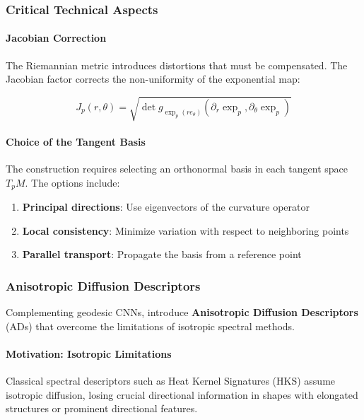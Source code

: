\subsubsection{Critical Technical Aspects}

\paragraph{Jacobian Correction}

The Riemannian metric introduces distortions that must be compensated. The Jacobian factor corrects the non-uniformity of the exponential map:

\begin{equation}
J_p(r, \theta) = \sqrt{\det g_{\exp_p(r e_\theta)}(\partial_r \exp_p, \partial_\theta \exp_p)}
\end{equation}

\paragraph{Choice of the Tangent Basis}

The construction requires selecting an orthonormal basis in each tangent space $T_p M$. The options include:
\begin{enumerate}
    \item \textbf{Principal directions}: Use eigenvectors of the curvature operator
    \item \textbf{Local consistency}: Minimize variation with respect to neighboring points
    \item \textbf{Parallel transport}: Propagate the basis from a reference point
\end{enumerate}

\subsubsection{Anisotropic Diffusion Descriptors}

Complementing geodesic CNNs, \citet{Boscaini2016AnisotropicDD} introduce \textbf{Anisotropic Diffusion Descriptors} (ADs) that overcome the limitations of isotropic spectral methods.

\paragraph{Motivation: Isotropic Limitations}

Classical spectral descriptors such as Heat Kernel Signatures (HKS) assume isotropic diffusion, losing crucial directional information in shapes with elongated structures or prominent directional features.


